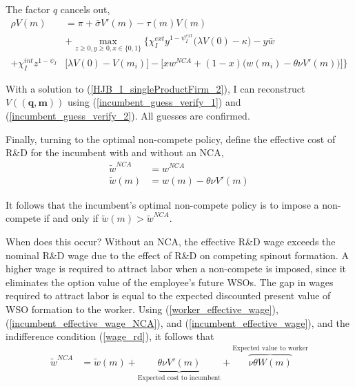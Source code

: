 \documentclass[12pt,english]{article}
\theoremstyle{remark}
\begin{document}
The factor $q$ cancels out, 
\begin{align}
		\rho V(m) &= \pi + \bar{\sigma} V'(m)  - \tau(m) V(m) \nonumber \\ 
	& + \max_{z \ge 0, y \ge 0, x \in \{0,1\}} \Bigg\{ \chi_I^{ext} y^{1-\psi_I^{ext}} \Big( \lambda V(0) - \kappa \Big) - y \bar{w} \nonumber \\
	+  \chi_I^{int} z^{1-\psi_I} &\Bigg[ \lambda V(0) - V(m_i) \Bigg] - \Bigg[ x w^{NCA} + (1-x) \Big( w(m_i) - \theta \nu V'(m)\Big) \Bigg] \Bigg\} \label{HJB_I_singleProductFirm_2}
\end{align}

With a solution to (\ref{HJB_I_singleProductFirm_2}), I can reconstruct $V(\mathbf{(q,m)})$ using (\ref{incumbent_guess_verify_1}) and (\ref{incumbent_guess_verify_2}). All guesses are confirmed. 

Finally, turning to the optimal non-compete policy, define the effective cost of R\&D for the incumbent with and without an NCA,
\begin{align}
	\tilde{w}^{NCA} &= w^{NCA}  \label{incumbent_effective_wage_NCA} \\
	\tilde{w}(m) &= w(m) - \theta \nu V'(m)  \label{incumbent_effective_wage}
\end{align}

It follows that the incumbent's optimal non-compete policy is to impose a non-compete if and only if $\tilde{w}(m) > \tilde{w}^{NCA}$. 

When does this occur? Without an NCA, the effective R\&D wage exceeds the nominal R\&D wage due to the effect of R\&D on competing spinout formation. A higher wage is required to attract labor when a non-compete is imposed, since it eliminates the option value of the employee's future WSOs. The gap in wages required to attract labor is equal to the expected discounted present value of WSO formation to the worker. Using (\ref{worker_effective_wage}), (\ref{incumbent_effective_wage_NCA}), and (\ref{incumbent_effective_wage}), and the indifference condition (\ref{wage_rd}), it follows that
\begin{align}
	\tilde{w}^{NCA} &= \tilde{w}(m) + \underbrace{\theta \nu V'(m)}_{\textrm{Expected cost to incumbent}} + \overbrace{\nu \theta W(m) }^{\textrm{Expected value to worker}}
\end{align} 
\end{document}
